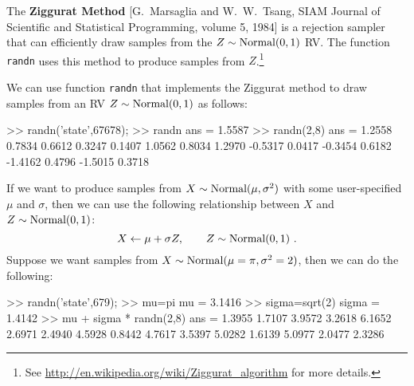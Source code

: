 The {\bf Ziggurat Method} [G.~Marsaglia and W.~W.~Tsang, SIAM Journal of Scientific and Statistical Programming, volume 5, 1984] is a rejection sampler that can efficiently draw samples from the $Z \sim \mbox{{\rm Normal}}(0,1)$ RV.  The \Matlab function {\tt randn} uses this method to produce samples from $Z$.\footnote{ {\tiny See \url{http://en.wikipedia.org/wiki/Ziggurat\_algorithm}} for more details.}

\begin{labwork}\label{LW:randn}
We can use \Matlab function {\tt randn} that implements the Ziggurat method to draw samples from an RV $Z \sim \mbox{{\rm Normal}}(0,1)$ as follows:
\begin{VrbM}
>> randn('state',67678); %
>> randn %
ans =    1.5587
>> randn(2,8) %
ans =
    1.2558    0.7834    0.6612    0.3247    0.1407    1.0562    0.8034    1.2970
   -0.5317    0.0417   -0.3454    0.6182   -1.4162    0.4796   -1.5015    0.3718
\end{VrbM}
If we want to produce samples from $X \sim \mbox{{\rm Normal}}(\mu,\sigma^2)$ with some user-specified $\mu$ and $\sigma$, then we can use the following relationship between $X$ and $Z \sim \mbox{{\rm Normal}}(0,1)$:
\[
X \gets \mu + \sigma Z, \qquad Z \sim \mbox{{\rm Normal}}(0,1) \ .
\]
Suppose we want samples from $X \sim \mbox{{\rm Normal}}(\mu=\pi, \sigma^2=2)$, then we can do the following:
\begin{VrbM}
>> randn('state',679); %
>> mu=pi %
mu =    3.1416
>> sigma=sqrt(2) %
sigma =    1.4142
>> mu + sigma * randn(2,8) %
ans =
    1.3955    1.7107    3.9572    3.2618    6.1652    2.6971    2.4940    4.5928
    0.8442    4.7617    3.5397    5.0282    1.6139    5.0977    2.0477    2.3286
\end{VrbM}
\end{labwork}

